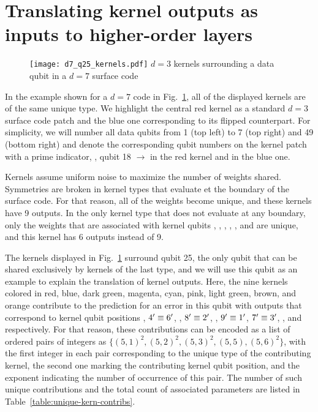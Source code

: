 \section{Translating kernel outputs as inputs to higher-order layers}

\begin{figure*}[htb]
\centering
\texttt{[image: d7\_q25\_kernels.pdf]}
\ccaption
{$d=3$ kernels surrounding a data qubit in a $d=7$ surface code}
{
}
\label{fig:d7wkern}
\end{figure*}

In the example shown for a $d=7$ code in Fig.~\ref{fig:d7wkern}, all of the displayed kernels are of the same unique type. We highlight the central red kernel as a standard $d=3$ surface code patch and the blue one corresponding to its flipped counterpart. For simplicity, we will number all data qubits from 1 (top left) to 7 (top right) and 49 (bottom right) and denote the corresponding qubit numbers on the kernel patch with a prime indicator, \eg, qubit 18 $\rightarrow$  in the red kernel and  in the blue one.

Kernels assume uniform noise to maximize the number of weights shared. Symmetries are broken in kernel types that evaluate et the boundary of the surface code. For that reason, all of the weights become unique, and these kernels have 9 outputs. In the only kernel type that does not evaluate at any boundary, only the weights that are associated with kernel qubits , , , , , and  are unique, and this kernel has 6 outputs instead of 9.

The kernels displayed in Fig.~\ref{fig:d7wkern} surround qubit 25, the only qubit that can be shared exclusively by kernels of the last type, and we will use this qubit as an example to explain the translation of kernel outputs. Here, the nine kernels colored in red, blue, dark green, magenta, cyan, pink, light green, brown, and orange contribute to the prediction for an error in this qubit with outputs that correspond to kernel qubit positions , $4^\prime\equiv6^\prime$, , $8^\prime\equiv2^\prime$, , $9^\prime\equiv1^\prime$, $7^\prime\equiv3^\prime$, , and  respectively. For that reason, these contributions can be encoded as a list of ordered pairs of integers as $\{(5,1)^2, (5,2)^2, (5,3)^2, (5,5), (5,6)^2\}$, with the first integer in each pair corresponding to the unique type of the contributing kernel, the second one marking the contributing kernel qubit position, and the exponent indicating the number of occurrence of this pair. The number of such unique contributions and the total count of associated parameters are listed in Table~\ref{table:unique-kern-contribs}.

